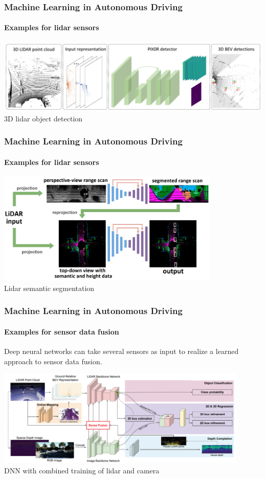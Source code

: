 {\begin{frame}
\frametitle{Machine Learning in Autonomous Driving}
\framesubtitle{Examples for lidar sensors}
\centering
\includegraphics[width=\textwidth]{images/pixor_lidar_object_detection.png}\\
\footnotesize{3D lidar object detection \cite{Yang2018}}
\end{frame}

\begin{frame}
\frametitle{Machine Learning in Autonomous Driving}
\framesubtitle{Examples for lidar sensors}
\centering
\includegraphics[width=0.8\textwidth]{images/nvidia_lidar_semantic_segmentation.png}\\
\vspace{0.2cm}
\footnotesize{Lidar semantic segmentation \cite{Chen2020}}
\end{frame}

\begin{frame}
\frametitle{Machine Learning in Autonomous Driving}
\framesubtitle{Examples for sensor data fusion}
Deep neural networks can take several sensors as input to realize a learned
approach to sensor data fusion.
\begin{center}
\includegraphics[width=0.9\textwidth]{images/uber_dnn_sensor_fusion.png}\\
\vspace{0.1cm}
\footnotesize{DNN with combined training of lidar and camera \cite{Liang2019}}
\end{center}
\end{frame}

}
